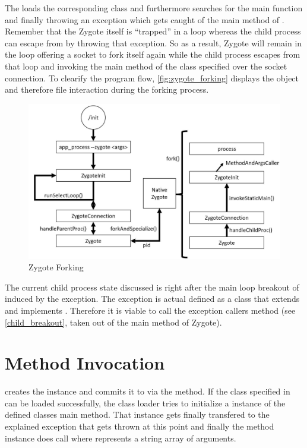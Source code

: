 The  loads the corresponding class and furthermore
searches for the main function and finally throwing an
 exception which gets caught of the main method of . Remember that the Zygote itself is ``trapped'' in a loop whereas the child process can escape from by throwing that exception.
So as a result, Zygote will remain in the loop offering a socket to fork
itself again while the child process escapes from that loop and
invoking the main method of the class specified over the socket
connection.
To clearify the program flow, \autoref{fig:zygote_forking} displays
the object and therefore file interaction during the forking process.

\begin{figure}[htb]
  \centering
  \includegraphics[width={\textwidth}]{figures/zygote_forking}
  \caption[Zygote Forking]{Zygote Forking}
  \label{fig:zygote_forking}
\end{figure}


The current child process state discussed is right after the main loop
breakout of  induced by the exception. The exception
is actual defined as a class that extends  and implements
. Therefore it is viable to call the exception callers
 method (see \autoref{child_breakout}, taken out of the main
method of Zygote).




\section{Method Invocation}\label{cl_loading}
 creates the  instance and commits it to
 via the  method. If the class specified
in  can be loaded successfully, the class loader tries to initialize a
 instance of the defined classes main method.
That instance  gets finally transfered to the explained exception that gets thrown
at this point and finally the method instance  does call
 where  represents a string array of
arguments.

